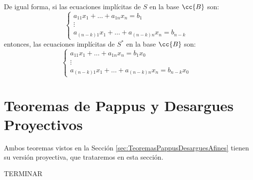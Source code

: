 De igual forma, si las ecuaciones implícitas de $S$ en la base $\cc{B}$ son:
\begin{equation*}
    \left\{
        \begin{array}{c}
            a_{11}x_1 + \dots + a_{1n}x_n = b_1\\
            \vdots\\
            a_{(n-k)1}x_1 + \dots + a_{(n-k)n}x_n = b_{n-k}
        \end{array}
    \right.
\end{equation*}
entonces, las ecuaciones implícitas de $S^\ast$ en la base $\cc{B}$ son:
\begin{equation*}
    \left\{
        \begin{array}{c}
            a_{11}x_1 + \dots + a_{1n}x_n = b_1x_0\\
            \vdots\\
            a_{(n-k)1}x_1 + \dots + a_{(n-k)n}x_n = b_{n-k}x_0            
        \end{array}
    \right.
\end{equation*}




\section{Teoremas de Pappus y Desargues Proyectivos}

Ambos teoremas vistos en la Sección \ref{sec:TeoremasPappusDesarguesAfines}
tienen su versión proyectiva, que trataremos en esta sección.

TERMINAR %